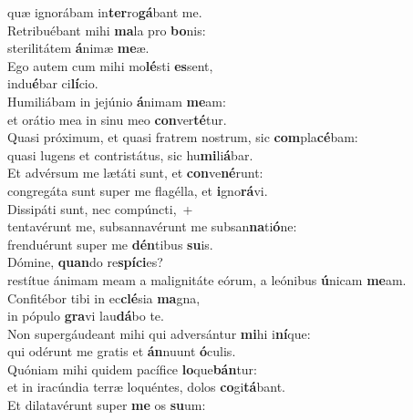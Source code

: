 \oddverse quæ ignorábam in\textbf{ter}ro\textbf{gá}bant me.\\
\evenverse Retribuébant mihi \textbf{ma}la pro \textbf{bo}nis:~\*\\
\evenverse sterilitátem \textbf{á}nimæ \textbf{me}æ.\\
\oddverse Ego autem cum mihi mo\textbf{lé}sti \textbf{es}sent,~\*\\
\oddverse indu\textbf{é}bar ci\textbf{lí}cio.\\
\evenverse Humiliábam in jejúnio \textbf{á}nimam \textbf{me}am:~\*\\
\evenverse et orátio mea in sinu meo \textbf{con}ver\textbf{té}tur.\\
\oddverse Quasi próximum, et quasi fratrem nostrum, sic \textbf{com}pla\textbf{cé}bam:~\*\\
\oddverse quasi lugens et contristátus, sic hu\textbf{mi}li\textbf{á}bar.\\
\evenverse Et advérsum me lætáti sunt, et \textbf{con}ve\textbf{né}runt:~\*\\
\evenverse congregáta sunt super me flagélla, et \textbf{i}gno\textbf{rá}vi.\\
\oddverse Dissipáti sunt, nec compúncti,~+\\
\oddverse  tentavérunt me, subsannavérunt me subsan\textbf{na}ti\textbf{ó}ne:~\*\\
\oddverse frenduérunt super me \textbf{dén}tibus \textbf{su}is.\\
\evenverse Dómine, \textbf{quan}do re\textbf{spí}\textbf{ci}es?~\*\\
\evenverse restítue ánimam meam a malignitáte eórum, a leónibus \textbf{ú}nicam \textbf{me}am.\\
\oddverse Confitébor tibi in ec\textbf{clé}sia \textbf{ma}gna,~\*\\
\oddverse in pópulo \textbf{gra}vi lau\textbf{dá}bo te.\\
\evenverse Non supergáudeant mihi qui adversántur \textbf{mi}hi i\textbf{ní}que:~\*\\
\evenverse qui odérunt me gratis et \textbf{án}nuunt \textbf{ó}culis.\\
\oddverse Quóniam mihi quidem pacífice \textbf{lo}que\textbf{bán}tur:~\*\\
\oddverse et in iracúndia terræ loquéntes, dolos \textbf{co}gi\textbf{tá}bant.\\
\evenverse Et dilatavérunt super \textbf{me} os \textbf{su}um:~\*\\
